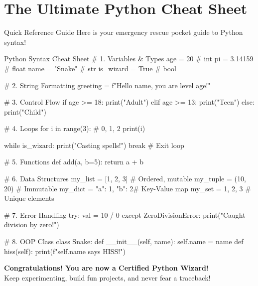 \documentclass[11pt,a4paper,oneside]{book}
\begin{document}
\frontmatter


\clearpage
\tableofcontents
\clearpage

\mainmatter









\backmatter
\chapter{The Ultimate Python Cheat Sheet}

\begin{snakesnack}{Quick Reference Guide}
Here is your emergency rescue pocket guide to Python syntax!
\end{snakesnack}

\begin{pycode}{Python Syntax Cheat Sheet}
# 1. Variables & Types
age = 20                 # int
pi = 3.14159             # float
name = "Snake"           # str
is_wizard = True         # bool

# 2. String Formatting
greeting = f"Hello {name}, you are level {age}!"

# 3. Control Flow
if age >= 18:
    print("Adult")
elif age >= 13:
    print("Teen")
else:
    print("Child")

# 4. Loops
for i in range(3):        # 0, 1, 2
    print(i)

while is_wizard:
    print("Casting spells!")
    break                 # Exit loop

# 5. Functions
def add(a, b=5):
    return a + b

# 6. Data Structures
my_list = [1, 2, 3]       # Ordered, mutable
my_tuple = (10, 20)       # Immutable
my_dict = {"a": 1, "b": 2}# Key-Value map
my_set = {1, 2, 3}        # Unique elements

# 7. Error Handling
try:
    val = 10 / 0
except ZeroDivisionError:
    print("Caught division by zero!")

# 8. OOP Class
class Snake:
    def __init__(self, name):
        self.name = name
    def hiss(self):
        print(f"{self.name} says HISS!")
\end{pycode}

\vspace{1cm}
\begin{center}
{\Large \bfseries \color{pypurple} Congratulations! You are now a Certified Python Wizard!} \\
\vspace{0.3cm}
{\color{codegray} Keep experimenting, build fun projects, and never fear a traceback!}
\end{center}
\end{document}
